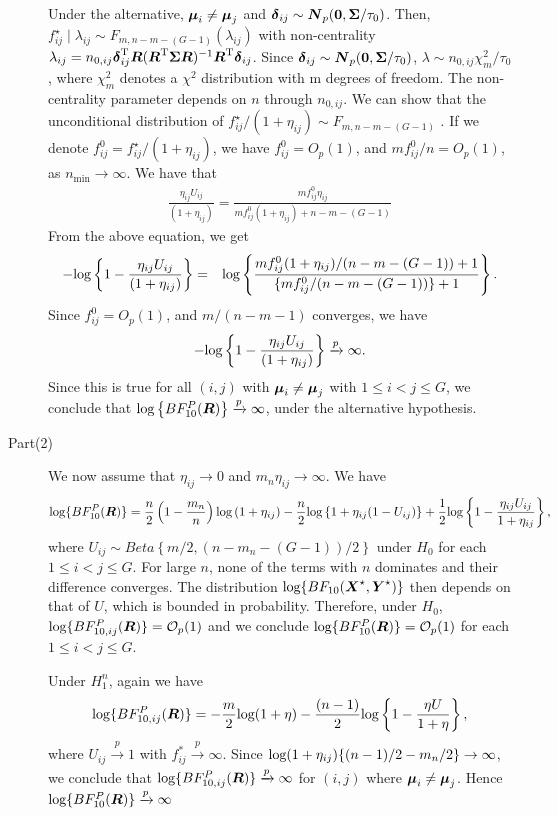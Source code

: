 \documentclass[12pt]{article}
\def\log{\hbox{log}}
\def\log{\hbox{log}}
\def\bse{\begin{eqnarray*}}
\def\ese{\end{eqnarray*}}
\def\be{\begin{eqnarray}}
\def\ee{\end{eqnarray}}
\def\trans{^{\rm T}}
\newcommand{\uN}       {\mbox{\boldmath$N$}}
\newcommand{\uR}       {\mbox{\boldmath$R$}}
\newcommand{\uX}       {\mbox{\boldmath$X$}}
\newcommand{\uY}       {\mbox{\boldmath$Y$}}
\newcommand{\udelta}            {\mbox{\boldmath$\delta$}}
\newcommand{\umu}               {\mbox{\boldmath$\mu$}}
\newcommand{\uSigma}            {\mbox{\boldmath$\Sigma$}}
\begin{document}
\begin{description}
Under the alternative, $\umu_{i} \neq \umu_{j}$ and $\udelta_{ij} \sim \uN_{p}({\bf 0}, \uSigma /\tau_{0})$.
Then, $f_{ij}^{\star} \mid   \lambda_{ij} \sim F_{m, n-m-(G-1)}(\lambda_{ij})$
with non-centrality $\lambda_{ij} = n_{0,ij}\udelta_{ij}\trans\uR(\uR\trans \uSigma \uR)^{-1}\uR\trans \udelta_{ij}$.
Since $\udelta_{ij} \sim \uN_{p}({\bf 0}, \uSigma /\tau_{0})$, $\lambda \sim n_{0,ij}\chi_{m}^{2}/\tau_{0}$,
where $\chi_{m}^{2}$ denotes a $\chi^{2}$ distribution with m degrees of freedom. The non-centrality parameter depends on $n$ through $n_{0,ij}$.
We can show that the unconditional distribution of $f_{ij}^{\star} /(1 + \eta_{ij}) \sim F_{m, n-m-(G-1)}$ \citep[see][page 704]{johnson2005bayes}.
If we denote $f_{ij}^{0} =  f_{ij}^{\star} /(1 + \eta_{ij})$, we have $f_{ij}^{0} = O_{p}(1)$, and $mf_{ij}^{0}/n = O_{p}(1)$, as $n_{\min} \rightarrow \infty$.
We have that
\be
\frac{\eta_{ij} U_{ij}}{(1+\eta_{ij})} = \frac{ m f_{ij}^{0}\eta_{ij}}{m f_{ij}^{0}(1+\eta_{ij})+n-m-(G-1)} \nonumber
\ee
From the above equation, we get
\be
-\log\left\{ 1 - \frac{\eta_{ij} U_{ij}}{(1+\eta_{ij})} \right \} &=& \log\left\{ \frac{mf_{ij}^{0}(1+\eta_{ij})/(n-m-(G-1)) + 1}{\{mf_{ij}^{0}/(n-m-(G-1))\} +1 }\right\}. \nonumber
\ee
Since $f_{ij}^{0} = O_{p}(1)$, and $m/(n-m-1)$ converges, we have
\bse
 -\log\left\{ 1 - \frac{\eta_{ij} U_{ij}}{(1+\eta_{ij})} \right \} \xrightarrow[]{p} \infty.
\ese
Since this is true for all $(i,j)$ with $\umu_i \neq \umu_j$ with $1 \leq i < j \leq G$,  we conclude that $\log\left\{BF^{P}_{10}(\uR) \right \} \xrightarrow[]{p} \infty$, under the alternative hypothesis.

\item[Part(2)]
We now assume that $\eta_{ij} \rightarrow 0$ and $m_n \eta_{ij} \rightarrow \infty$. We have
\be
 \log\{BF^{P}_{10}(\uR)\} =\frac{n}{2}\left( 1 - \frac{m_n}{n}\right)\log\left(1 + \eta_{ij} \right) - \frac{n}{2}\log\left\{ 1 + \eta_{ij}(1-U_{ij}) \right \} +\frac{1}{2}\log \left\{1 - \frac{\eta_{ij} U_{ij}}{1+\eta_{ij}}\right\},  \nonumber
\ee
where $U_{ij} \sim Beta\left\{ m/2,  (n - m_n -(G-1))/2 \right\}$ under $H_0$ for each $1 \leq i < j \leq G$.
For large $n$, none of the terms with $n$ dominates and their difference converges.
The distribution $ \log\{BF_{10}(\uX^{\star},\uY^{\star}) \}$ then depends on that of $U$, which is bounded in probability.
Therefore, under $H_0$, $\log\{BF^{P}_{10, ij}(\uR) \} = \mathcal{O}_{p}(1)$ and we conclude $\log\{BF^{P}_{10}(\uR) \} = \mathcal{O}_{p}(1)$ for each $1 \leq i < j \leq G$.

Under $H^{n}_{1}$, again we have
\be
\log\{BF^{P}_{10,ij}(\uR) \} = -\frac{m}{2}\log(1 + \eta) - \frac{(n-1)}{2}\log\left\{ 1 - \frac{\eta U}{1 + \eta} \right\}, \nonumber
\ee
where $U_{ij} \xrightarrow[]{p} 1$ with $f_{ij}^{*}\xrightarrow[]{p} \infty$.
Since $\log(1 + \eta_{ij})\{ (n-1)/2 - m_n/2\} \rightarrow \infty$, we conclude that $\log\{BF^{P}_{10,ij}(\uR) \} \xrightarrow[]{p} \infty $ for $(i,j)$ where $\umu_i \neq \umu_j$. Hence $\log\{BF^{P}_{10}(\uR) \} \xrightarrow[]{p} \infty $
\end{description}
\end{document}
